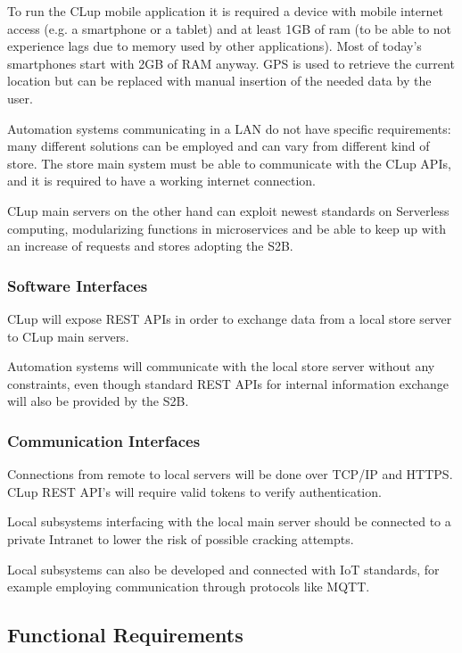 To run the CLup mobile application it is required a device with mobile internet access (e.g. a smartphone or a tablet) and at least 1GB of ram (to be able to not experience lags due to memory used by other applications). Most of today's smartphones start with 2GB of RAM anyway.
GPS is used to retrieve the current location but can be replaced with manual insertion of the needed data by the user.

Automation systems communicating in a LAN do not have specific requirements: many different solutions can be employed and can vary from different kind of store. The store main system must be able to communicate with the CLup APIs, and it is required to have a working internet connection.

CLup main servers on the other hand can exploit newest standards on Serverless computing, modularizing functions in microservices and be able to keep up with an increase of requests and stores adopting the S2B.

\subsubsection{Software Interfaces}
CLup will expose REST APIs in order to exchange data from a local store server to CLup main servers.

Automation systems will communicate with the local store server without any constraints, even though standard REST APIs for internal information exchange will also be provided by the S2B.

\subsubsection{Communication Interfaces}

Connections from remote to local servers will be done over TCP/IP and HTTPS.
CLup REST API's will require valid tokens to verify authentication.

Local subsystems interfacing with the local main server should be connected to a private Intranet to lower the risk of possible cracking attempts.

Local subsystems can also be developed and connected with IoT standards, for example employing communication through protocols like MQTT.

\vfill
\pagebreak

\subsection{Functional Requirements}
